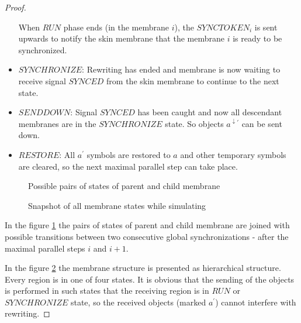 \begin{proof}
\begin{itemize}
    When $RUN$ phase ends (in the membrane $i$), the $SYNCTOKEN_i$ is sent upwards to notify the skin membrane that the membrane $i$ is ready to be synchronized.

    \item $SYNCHRONIZE$: Rewriting has ended and membrane is now waiting to receive signal $SYNCED$ from the skin membrane to continue to the next state.

    \item $SENDDOWN$: Signal $SYNCED$ has been caught and now all descendant membranes are in the $SYNCHRONIZE$ state. So objects $a^{\downarrow\prime}$ can be sent down.

    \item $RESTORE$: All $a^{\prime}$ symbols are restored to $a$ and other temporary symbols are cleared, so the next maximal parallel step can take place.
  \end{itemize}

  \begin{figure}
    \def\svgwidth{\textwidth}
    
    \caption{Possible pairs of states of parent and child membrane}
    \label{fig:possible_pairs_of_states_of_parent_and_child_membrane}
  \end{figure}

  \begin{figure}
    \def\svgwidth{\textwidth}
    
    \caption{Snapshot of all membrane states while simulating}
    \label{fig:snapshot_of_all_membrane_states_while_simulating}
  \end{figure}

  In the figure \ref{fig:possible_pairs_of_states_of_parent_and_child_membrane} the pairs of states of parent and child membrane are joined with possible transitions between two consecutive global synchronizations - after the maximal parallel steps $i$ and $i+1$.

  In the figure \ref{fig:snapshot_of_all_membrane_states_while_simulating} the membrane structure is presented as hierarchical structure. Every region is in one of four states. It is obvious that the sending of the objects is performed in such states that the receiving region is in $RUN$ or $SYNCHRONIZE$ state, so the received objects (marked $a^{\prime}$) cannot interfere with rewriting.


\end{proof}
